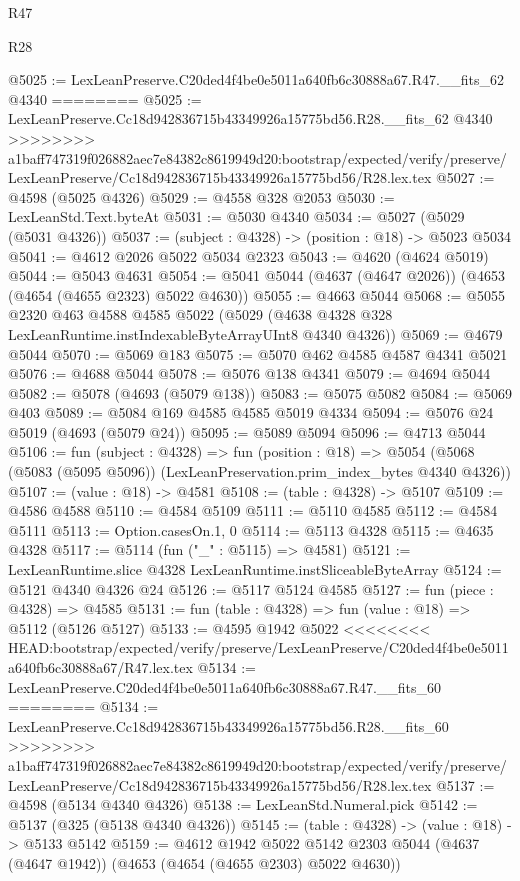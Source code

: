 \begin{lexlean}{R47}
\begin{lexlean}{R28}
\begin{coremodule}
{{{{{{{{{{{{{{{{{{{{{{{{{{{{{{{{{{{{{{{{{{{{{{{{{{{{{{{{{{{{{{{{{{{{{{{{{{{{{{{{{{{{{{{{{{{{{{{{{{{{{{{{{{{{{{{{{{{{{{{{{{{{{{{{{{{{{@5025 := LexLeanPreserve.C20ded4f4be0e5011a640fb6c30888a67.R47.__fits_62 @4340
========
@5025 := LexLeanPreserve.Cc18d942836715b43349926a15775bd56.R28.__fits_62 @4340
>>>>>>>> a1baff747319f026882aec7e84382c8619949d20:bootstrap/expected/verify/preserve/LexLeanPreserve/Cc18d942836715b43349926a15775bd56/R28.lex.tex
@5027 := @4598 (@5025 @4326)
@5029 := @4558 @328 @2053
@5030 := LexLeanStd.Text.byteAt
@5031 := @5030 @4340
@5034 := @5027 (@5029 (@5031 @4326))
@5037 := (subject : @4328) -> (position : @18) -> @5023 @5034
@5041 := @4612 @2026 @5022 @5034 @2323
@5043 := @4620 (@4624 @5019)
@5044 := @5043 @4631
@5054 := @5041 @5044 (@4637 (@4647 @2026)) (@4653 (@4654 (@4655 @2323) @5022 @4630))
@5055 := @4663 @5044
@5068 := @5055
    @2320
    @463
    @4588
    @4585
    @5022
    (@5029 (@4638 @4328 @328 LexLeanRuntime.instIndexableByteArrayUInt8 @4340 @4326))
@5069 := @4679 @5044
@5070 := @5069 @183
@5075 := @5070 @462 @4585 @4587 @4341 @5021
@5076 := @4688 @5044
@5078 := @5076 @138 @4341
@5079 := @4694 @5044
@5082 := @5078 (@4693 (@5079 @138))
@5083 := @5075 @5082
@5084 := @5069 @403
@5089 := @5084 @169 @4585 @4585 @5019 @4334
@5094 := @5076 @24 @5019 (@4693 (@5079 @24))
@5095 := @5089 @5094
@5096 := @4713 @5044
@5106 := fun (subject : @4328) =>
  fun (position : @18) =>
  @5054 (@5068 (@5083 (@5095 @5096)) (LexLeanPreservation.prim_index_bytes @4340 @4326))
@5107 := (value : @18) -> @4581
@5108 := (table : @4328) -> @5107
@5109 := @4586 @4588
@5110 := @4584 @5109
@5111 := @5110 @4585
@5112 := @4584 @5111
@5113 := Option.casesOn.{1, 0}
@5114 := @5113 @4328
@5115 := @4635 @4328
@5117 := @5114 (fun ("_" : @5115) => @4581)
@5121 := LexLeanRuntime.slice @4328 LexLeanRuntime.instSliceableByteArray
@5124 := @5121 @4340 @4326 @24
@5126 := @5117 @5124 @4585
@5127 := fun (piece : @4328) => @4585
@5131 := fun (table : @4328) => fun (value : @18) => @5112 (@5126 @5127)
@5133 := @4595 @1942 @5022
<<<<<<<< HEAD:bootstrap/expected/verify/preserve/LexLeanPreserve/C20ded4f4be0e5011a640fb6c30888a67/R47.lex.tex
@5134 := LexLeanPreserve.C20ded4f4be0e5011a640fb6c30888a67.R47.__fits_60
========
@5134 := LexLeanPreserve.Cc18d942836715b43349926a15775bd56.R28.__fits_60
>>>>>>>> a1baff747319f026882aec7e84382c8619949d20:bootstrap/expected/verify/preserve/LexLeanPreserve/Cc18d942836715b43349926a15775bd56/R28.lex.tex
@5137 := @4598 (@5134 @4340 @4326)
@5138 := LexLeanStd.Numeral.pick
@5142 := @5137 (@325 (@5138 @4340 @4326))
@5145 := (table : @4328) -> (value : @18) -> @5133 @5142
@5159 := @4612
    @1942
    @5022
    @5142
    @2303
    @5044
    (@4637 (@4647 @1942))
    (@4653 (@4654 (@4655 @2303) @5022 @4630))
}}}}}}}}}}}}}}}}}}}}}}}}}}}}}}}}}}}}}}}}}}}}}}}}}}}}}}}}}}}}}}}}}}}}}}}}}}}}}}}}}}}}}}}}}}}}}}}}}}}}}}}}}}}}}}}}}}}}}}}}}}}}}}}}}}}}}
\end{coremodule}
\end{lexlean}
\end{lexlean}

